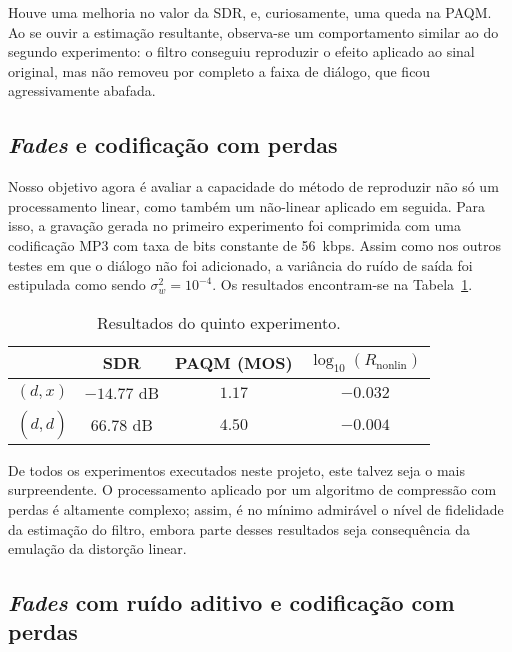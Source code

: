 Houve uma melhoria no valor da SDR, e, curiosamente, uma queda na PAQM. Ao se ouvir a
estimação resultante, observa-se um comportamento similar ao do segundo experimento: o
filtro conseguiu reproduzir o efeito aplicado ao sinal original, mas não removeu por
completo a faixa de diálogo, que ficou agressivamente abafada.

\subsection{\textit{Fades} e codificação com perdas}

Nosso objetivo agora é avaliar a capacidade do método de reproduzir não só um
processamento linear, como também um não-linear aplicado em seguida. Para isso, a
gravação gerada no primeiro experimento foi comprimida com uma codificação MP3 com taxa
de bits constante de 56~kbps. Assim como nos outros testes em que o diálogo não foi
adicionado, a variância do ruído de saída foi estipulada como sendo $\sigma_w^2 =
	10^{-4}$. Os resultados encontram-se na Tabela~\ref{tab:unscented:experiment-5}.
{\def\arraystretch{1.25}\tabcolsep=10pt
\begin{table}[!ht]
	\centering
	\caption[Resultados do quinto experimento: \textit{fades} e codificação com perdas]{Resultados do quinto experimento.}
	\label{tab:unscented:experiment-5}
	\begin{tabular}{cccc}
		\toprule
		               & SDR         & PAQM (MOS) & $\log_{10}(R_{\text{nonlin}})$ \\
		\midrule
		$(d, x)$       & $-14.77$ dB & $1.17$     & $-0.032$                       \\
		$(d, \hat{d})$ & $66.78$ dB  & $4.50$     & $-0.004$                       \\ \bottomrule
	\end{tabular}
\end{table}
}

De todos os experimentos executados neste projeto, este talvez seja o mais
surpreendente. O processamento aplicado por um algoritmo de compressão com perdas é
altamente complexo; assim, é no mínimo admirável o nível de fidelidade da estimação do
filtro, embora parte desses resultados seja consequência da emulação da distorção
linear.

\subsection{\textit{Fades} com ruído aditivo e codificação com perdas}

